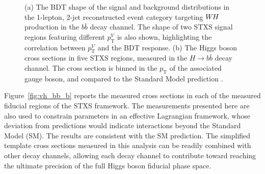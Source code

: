 \documentclass{moriond}
\def\wh{\texorpdfstring{\ensuremath{W\kern -0.1em H}\xspace}{WH\xspace}}
\begin{document}
\begin{figure}[!htbp]
  \centering
  \caption{
    (a) The BDT shape of the signal and background distributions in the 1-lepton, 2-jet
    reconstructed event category targeting \wh production in the $b\bar b$ decay channel. The shape of two STXS signal regions
    featuring different $p^{V}_\mathrm{T}$ is also shown, highlighting the correlation between
    $p^{V}_\mathrm{T}$ and the BDT response.
    (b) The Higgs boson cross sections in five STXS regions, measured in the $H{\rightarrow}b\bar b$ decay channel.
    The cross section is binned in the $p_\mathrm{T}$ of
    the associated gauge boson, and compared to the Standard Model prediction \cite{Aaboud:2019nan}.
  }
  \label{fig:vh_bb}
\end{figure}

Figure~\ref{fig:vh_bb_b} reports the measured cross sections in each of the measured fiducial regions
of the STXS framework. The measurements presented here are also used
to constrain parameters in an effective Lagrangian framework, whose
deviation from predictions would indicate interactions beyond the Standard Model (SM).
The results are consistent with the SM prediction.
The
simplified template cross sections measured in this analysis can be readily combined with other
decay channels, allowing each decay channel to contribute toward reaching the ultimate precision of
the full Higgs boson fiducial phase space.
\end{document}
